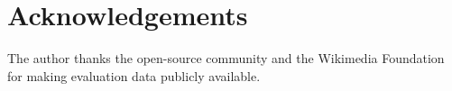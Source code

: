 
\section*{Acknowledgements}

The author thanks the open-source community and the Wikimedia Foundation for making evaluation data publicly available.

